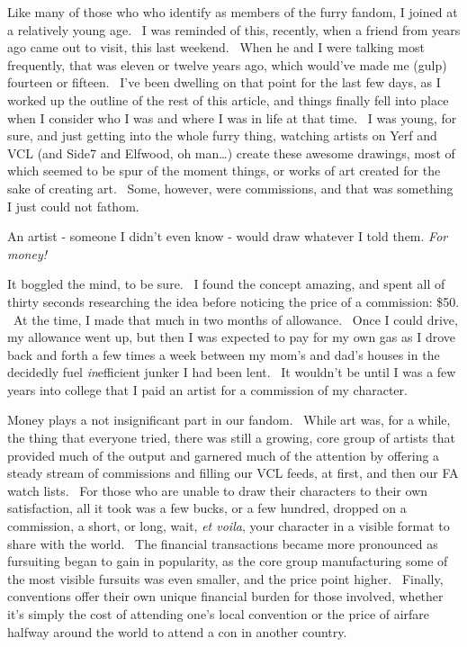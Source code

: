 Like many of those who who identify as members of the furry fandom, I
joined at a relatively young age. ~I was reminded of this, recently,
when a friend from years ago came out to visit, this last weekend. ~When
he and I were talking most frequently, that was eleven or twelve years
ago, which would've made me (gulp) fourteen or fifteen. ~I've been
dwelling on that point for the last few days, as I worked up the outline
of the rest of this article, and things finally fell into place when I
consider who I was and where I was in life at that time. ~I was young,
for sure, and just getting into the whole furry thing, watching artists
on Yerf and VCL (and Side7 and Elfwood, oh man\ldots{}) create these
awesome drawings, most of which seemed to be spur of the moment things,
or works of art created for the sake of creating art. ~Some, however,
were commissions, and that was something I just could not fathom.

An artist - someone I didn't even know - would draw whatever I told
them. \emph{For money!}

It boggled the mind, to be sure. ~I found the concept amazing, and spent
all of thirty seconds researching the idea before noticing the price of
a commission: \$50. ~At the time, I made that much in two months of
allowance. ~Once I could drive, my allowance went up, but then I was
expected to pay for my own gas as I drove back and forth a few times a
week between my mom's and dad's houses in the decidedly fuel
\emph{in}efficient junker I had been lent. ~It wouldn't be until I was a
few years into college that I paid an artist for a commission of my
character.

Money plays a not insignificant part in our fandom. ~While art was, for
a while, the thing that everyone tried, there was still a growing, core
group of artists that provided much of the output and garnered much of
the attention by offering a steady stream of commissions and filling our
VCL feeds, at first, and then our FA watch lists. ~For those who are
unable to draw their characters to their own satisfaction, all it took
was a few bucks, or a few hundred, dropped on a commission, a short, or
long, wait, \emph{et voila}, your character in a visible format to share
with the world. ~The financial transactions became more pronounced as
fursuiting began to gain in popularity, as the core group manufacturing
some of the most visible fursuits was even smaller, and the price point
higher. ~Finally, conventions offer their own unique financial burden
for those involved, whether it's simply the cost of attending one's
local convention or the price of airfare halfway around the world to
attend a con in another country.

